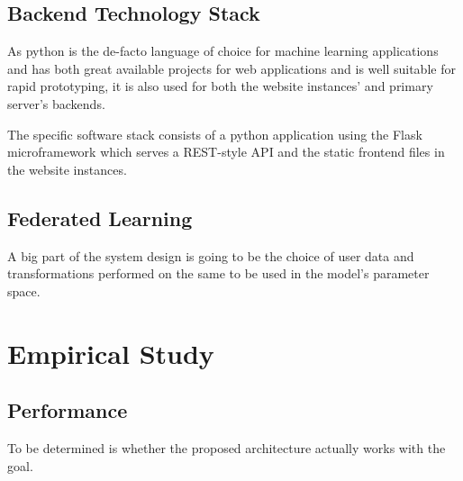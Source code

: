 \documentclass[
    fontsize=12pt,
    headings=small,
    parskip=half,           %
    bibliography=totoc,
    numbers=noenddot,       %
    open=any,               %
    ]{scrreprt}
\begin{document}
\section{Backend Technology Stack}

As python is the de-facto language of choice for machine learning applications and has both great available projects for web applications and is well suitable for rapid prototyping, it is also used for both the website instances' and primary server's backends.

The specific software stack consists of a python application using the Flask microframework which serves a REST-style API and the static frontend files in the website instances.


\section{Federated Learning}

A big part of the system design is going to be the choice of user data and transformations performed on the same to be used in the model's parameter space.


\chapter{Empirical Study}

\section{Performance}

To be determined is whether the proposed architecture actually works with the goal.



\begin{raggedright}
  \printbibliography
\end{raggedright}
\end{document}
